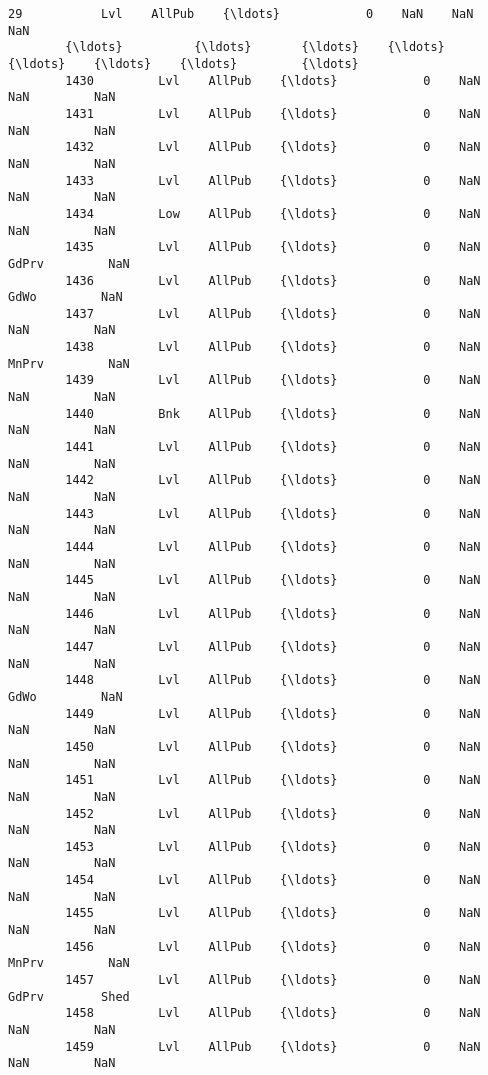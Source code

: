 \documentclass[11pt]{article}
\begin{document}
\begin{Verbatim}[commandchars=\\\{\}]
        29           Lvl    AllPub    {\ldots}            0    NaN    NaN         NaN   
        {\ldots}          {\ldots}       {\ldots}    {\ldots}          {\ldots}    {\ldots}    {\ldots}         {\ldots}   
        1430         Lvl    AllPub    {\ldots}            0    NaN    NaN         NaN   
        1431         Lvl    AllPub    {\ldots}            0    NaN    NaN         NaN   
        1432         Lvl    AllPub    {\ldots}            0    NaN    NaN         NaN   
        1433         Lvl    AllPub    {\ldots}            0    NaN    NaN         NaN   
        1434         Low    AllPub    {\ldots}            0    NaN    NaN         NaN   
        1435         Lvl    AllPub    {\ldots}            0    NaN  GdPrv         NaN   
        1436         Lvl    AllPub    {\ldots}            0    NaN   GdWo         NaN   
        1437         Lvl    AllPub    {\ldots}            0    NaN    NaN         NaN   
        1438         Lvl    AllPub    {\ldots}            0    NaN  MnPrv         NaN   
        1439         Lvl    AllPub    {\ldots}            0    NaN    NaN         NaN   
        1440         Bnk    AllPub    {\ldots}            0    NaN    NaN         NaN   
        1441         Lvl    AllPub    {\ldots}            0    NaN    NaN         NaN   
        1442         Lvl    AllPub    {\ldots}            0    NaN    NaN         NaN   
        1443         Lvl    AllPub    {\ldots}            0    NaN    NaN         NaN   
        1444         Lvl    AllPub    {\ldots}            0    NaN    NaN         NaN   
        1445         Lvl    AllPub    {\ldots}            0    NaN    NaN         NaN   
        1446         Lvl    AllPub    {\ldots}            0    NaN    NaN         NaN   
        1447         Lvl    AllPub    {\ldots}            0    NaN    NaN         NaN   
        1448         Lvl    AllPub    {\ldots}            0    NaN   GdWo         NaN   
        1449         Lvl    AllPub    {\ldots}            0    NaN    NaN         NaN   
        1450         Lvl    AllPub    {\ldots}            0    NaN    NaN         NaN   
        1451         Lvl    AllPub    {\ldots}            0    NaN    NaN         NaN   
        1452         Lvl    AllPub    {\ldots}            0    NaN    NaN         NaN   
        1453         Lvl    AllPub    {\ldots}            0    NaN    NaN         NaN   
        1454         Lvl    AllPub    {\ldots}            0    NaN    NaN         NaN   
        1455         Lvl    AllPub    {\ldots}            0    NaN    NaN         NaN   
        1456         Lvl    AllPub    {\ldots}            0    NaN  MnPrv         NaN   
        1457         Lvl    AllPub    {\ldots}            0    NaN  GdPrv        Shed   
        1458         Lvl    AllPub    {\ldots}            0    NaN    NaN         NaN   
        1459         Lvl    AllPub    {\ldots}            0    NaN    NaN         NaN   
        

\end{Verbatim}
\end{document}
